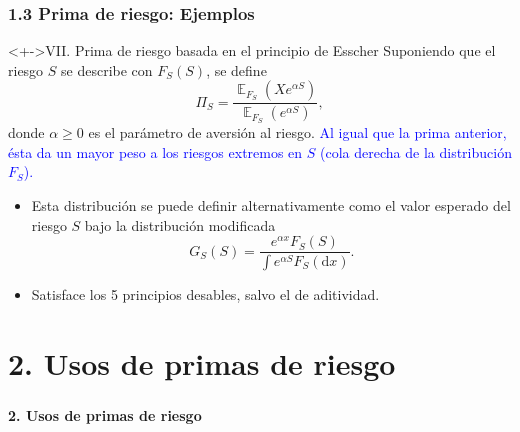 \documentclass[cjk,t,compress]{beamer}
\newcommand{\field}[1]{\mathbb{#1}}
\newcommand{\dd}{\mathrm{d}}
\newcommand{\expec}{\operatorname{\field{E}}}
\begin{document}
\begin{frame}[fragile]
	\frametitle{1.3 Prima de riesgo: Ejemplos}
	\scriptsize  	
	
	\vspace{0.2cm}
	\begin{block}<+->{VII. Prima de riesgo basada en el principio de Esscher}
		\vspace{0.1cm}
		Suponiendo que el riesgo $S$ se describe con $F_{S}(S)$, se define
		\begin{equation}
		\Pi_{S} = \frac{\expec _{F_{S}}(Xe^{\alpha S})}{\expec _{F_{S}}(e^{\alpha S})},
		\end{equation}
		donde $\alpha\geq 0$ es el par\'ametro de aversi\'on al riesgo.
		\newline
		\textcolor{blue}{Al igual que la prima anterior, \'esta da un mayor peso a los riesgos extremos en $S$ (cola derecha de la distribuci\'on $F_{S}$).}
		
		\begin{itemize}
			\item Esta distribuci\'on se puede definir alternativamente como el valor esperado del riesgo $S$ bajo la distribuci\'on modificada
			$$G_{S}(S)=\frac{e^{\alpha x}F_{S}(S)}{\int e^{\alpha S}F_{S}(\dd x)}.$$
			\item Satisface los 5 principios desables, salvo el de aditividad.
		\end{itemize}
	\end{block}  		
	
\end{frame}

%
%
\section{2. Usos de primas de riesgo}
\begin{frame}[fragile]
	\frametitle{}
	\vspace{5.5cm}
	\begin{flushright}
		\textcolor{MyDarkBlue}{\Large \bf 2. Usos de primas de riesgo}
	\end{flushright}
\end{frame}

%
%
\end{document}
